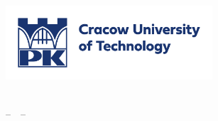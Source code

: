 \thispagestyle{empty}
\begin{titlepage}

  \condTWOSIDE{\changetext{}{19mm}{}{19mm}{}}

  \vspace{1cm}
  \begin{center}
    \includegraphics[width=7.7cm]{gfx/PK_POZIOM_CMYK_EN} \\ 
  \end{center}

  \begin{center}
    \vspace{0.1cm}
    \huge \textbf{\myUni}\\
    \vspace{0.4cm}
    \LARGE --~\myFaculty~--
  \end{center}

  \vfill
  \vfill

  \begin{center}
    \LARGE \textbf{\myTitle}
  \end{center} 

  \vfill
  \vfill
  \vfill


  \vfill
  \vfill


  \condTWOSIDE{\changetext{}{-19mm}{}{-19mm}{}}

\end{titlepage}
